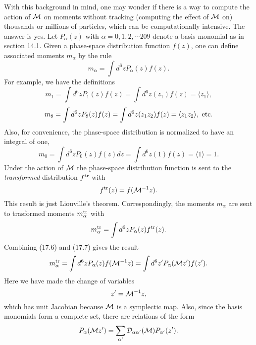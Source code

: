With this background in mind, one may wonder if there is a way to compute the action of ${\cal M}$ on moments without tracking (computing the effect of ${\cal M}$ on) thousands or millions of particles, which can be computationally intensive.  The answer is yes.  Let $P_{\alpha}(z)$ with $\alpha = 0,1,2,\cdots 209$ denote a basis monomial as in section 14.1.  Given a phase-space distribution function $f(z)$, one can define associated moments $m_{\alpha}$ by the rule
\begin{equation}
m_{\alpha} = \int d^6z P_{\alpha}(z) f(z).
\end{equation}
For example, we have the definitions
\begin{equation}
m_1 = \int d^6z P_1(z) f(z) = \int d^6z (z_1) f(z) = \langle z_1\rangle ,
\end{equation}
\begin{equation}
m_8 = \int d^6z P_8(z) f(z) = \int d^6z (z_1z_2) f(z) = \langle z_1z_2\rangle , \ {\rm etc}.
\end{equation}
Also, for convenience, the phase-space distribution is normalized to have an integral of one,
\begin{equation}
m_0 = \int d^6z P_0(z) f(z) dz =  \int d^6z(1) f(z) = \langle 1\rangle = 1.
\end{equation}
Under the action of ${\cal M}$ the phase-space distribution function is sent to the {\em transformed} distribution $f^{\rm tr}$ with
\begin{equation}
f^{\rm tr}(z) = f({\cal M}^{-1} z).
\end{equation}
This result is just Liouville's theorem.  Correspondingly, the moments $m_{\alpha}$ are sent to trasformed moments $m^{\rm tr}_{\alpha}$ with
\begin{equation}
m^{\rm tr}_{\alpha} = \int d^6z P_{\alpha}(z) f^{\rm tr}(z).
\end{equation}
Combining (17.6) and (17.7) gives the result
\begin{equation}
m^{\rm tr}_{\alpha} = \int d^6z P_{\alpha}(z) f({\cal M}^{-1} z) = \int d^6z^{\prime} P_{\alpha}({\cal M} z^{\prime}) f(z^{\prime}).
\end{equation}
Here we have made the change of variables
\begin{equation}
z^{\prime} = {\cal M}^{-1} z,
\end{equation}
which has unit Jacobian because ${\cal M}$ is a symplectic map.  Also, since the basis monomials form a complete set, there are relations of the form
\begin{equation}
P_{\alpha} ({\cal M} z^{\prime}) = \sum_{\alpha^{\prime}} {\cal D}_{\alpha \alpha^{\prime}} ({\cal M}) P_{\alpha^{\prime}}(z^{\prime}).
\end{equation}
